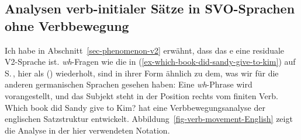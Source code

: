 

\subsection{Analysen verb-initialer Sätze in SVO-Sprachen ohne Verbbewegung}
\label{sec-aux-flat}

Ich habe in Abschnitt~\ref{sec-phenomenon-v2} erwähnt, dass das e eine residuale V2-Sprache
ist. \emph{wh}-Fragen wie die in (\ref{ex-which-book-did-sandy-give-to-kim}) auf
S.\,\pageref{ex-which-book-did-sandy-give-to-kim}, hier als () wiederholt, sind in ihrer Form ähnlich zu dem, was wir
für die anderen germanischen Sprachen gesehen haben: Eine \emph{wh}-Phrase wird vorangestellt, und das Subjekt steht in der
Position rechts vom finiten Verb.
\ea
Which book did Sandy give to Kim?
\z
\noindent
\citet{Borsley89} hat eine Verbbewegungsanalyse der englischen Satzstruktur
entwickelt. Abbildung~\ref{fig-verb-movement-English} zeigt die Analyse in der hier verwendeten Notation.

